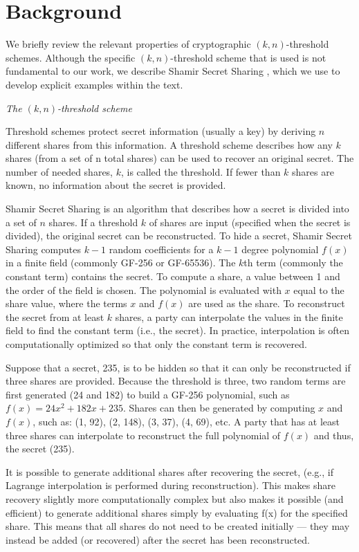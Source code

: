 \section{Background}
\label{SEC:background}

We briefly review the relevant properties of cryptographic $(k, n)$-threshold
schemes.  Although the specific $(k,n)$-threshold scheme that is used 
is not fundamental to our
work, we describe Shamir Secret Sharing \cite{shamir1979share}, which we use to develop
explicit examples within the text. 

\emph{The $(k, n)$-threshold scheme}

Threshold schemes protect secret information (usually a key) by deriving $n$
different shares from this information.  A threshold scheme describes how any $k$
shares (from a set of n total shares) can be used to recover an original
secret.  The number of needed shares, $k$, is called the threshold.  If fewer than
$k$ shares are known, no information about the secret is provided.

Shamir Secret Sharing is an algorithm that describes how a secret is divided
into a set of $n$ shares.  If a threshold $k$ of shares are input (specified when the 
secret is divided), the original secret can be reconstructed. To hide
a secret, Shamir Secret Sharing computes $k - 1$ random coefficients for a $k - 1$
degree polynomial $f(x)$ in a finite field (commonly GF-256 or GF-65536). The $k$th
term (commonly the constant term) contains the secret. To compute a share, a
value between 1 and the order of the field is chosen. The polynomial is
evaluated with $x$ equal to the share value, where the terms $x$ and $f(x)$ are used
as the share. To reconstruct the secret from at least $k$ shares, a party can
interpolate the values in the finite field to find the constant term (i.e., the
secret). In practice, interpolation is often computationally optimized so that
only the constant term is recovered.

Suppose that a secret, 235, is to be hidden so that it can only be
reconstructed if three shares are provided. Because the threshold is three, two
random terms are first generated (24 and 182) to build a GF-256 polynomial,
such as $f(x) = 24x^2 + 182x + 235$. Shares can then be generated by computing $x$
and $f(x)$, such as: (1, 92), (2, 148), (3, 37), (4, 69), etc. A party that has
at least three shares can interpolate to reconstruct the full polynomial of
$f(x)$ and thus, the secret (235). 

It is possible to generate additional shares after recovering the secret, (e.g.,
if Lagrange interpolation is performed during reconstruction). This makes share
recovery slightly more computationally complex but also makes it possible (and
efficient) to generate additional shares simply by evaluating f(x) for the
specified share.  This means that all shares do not need to be created
initially --- they may instead be added (or recovered) after the secret has
been reconstructed.

